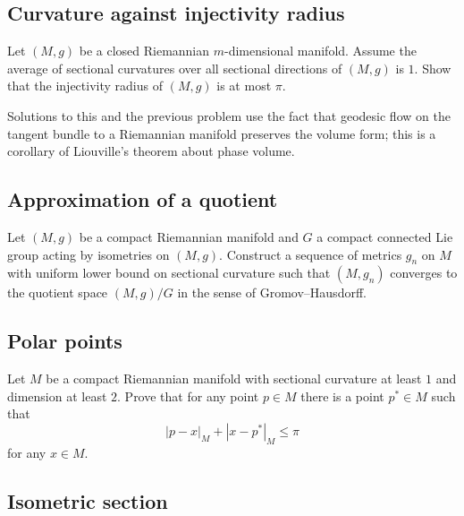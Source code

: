 \subsection*{Curvature against injectivity radius\thm}
\label{scalar-curv}

\begin{pr} 
Let $(M,g)$ be a closed 
Riemannian $m$-dimensional manifold.
Assume the average of sectional curvatures over all sectional directions of $(M,g)$ is $1$.
Show that the injectivity radius of $(M,g)$ is at most $\pi$.
\end{pr}

Solutions to this and the previous problem use the fact that geodesic flow on the tangent bundle to a Riemannian manifold preserves the volume form; this is a corollary of Liouville's theorem about phase volume.

\subsection*{Approximation of a quotient}

\begin{pr}
Let $(M,g)$ be a compact Riemannian manifold 
and $G$ a compact connected Lie group acting by isometries on $(M,g)$.
Construct a sequence of metrics $g_n$ on $M$ with uniform lower bound on sectional curvature such that $(M,g_n)$ converges to the quotient space $(M,g)/G$ in the sense of Gromov--Hausdorff.
\end{pr}


\subsection*{Polar points\many}
\label{milka-polar} 

\begin{pr}
Let $M$ be a compact Riemannian manifold with sectional curvature at least $1$ 
and dimension at least $2$. 
Prove that for any point $p\in M$ there is a point $p^*\in M$ such that 
\[|p-x|_M+|x-p^*|_M\le \pi\]
for any $x\in M$.
\end{pr}

\subsection*{Isometric section\hard}
\label{Isometric section}

